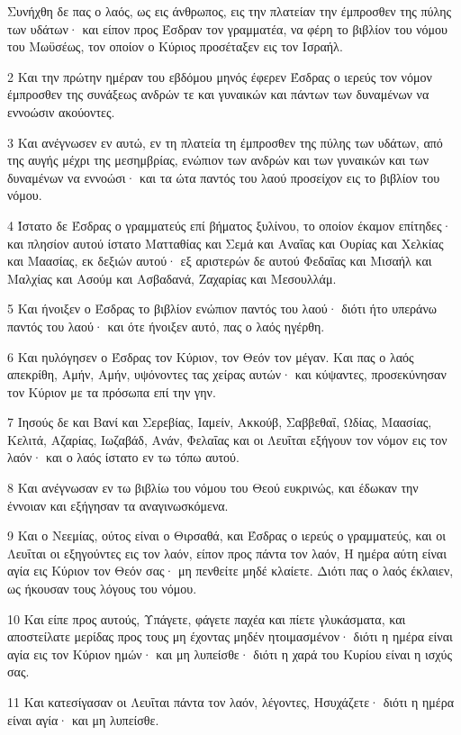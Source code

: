\par Συνήχθη δε πας ο λαός, ως εις άνθρωπος, εις την πλατείαν την έμπροσθεν της πύλης των υδάτων· και είπον προς Έσδραν τον γραμματέα, να φέρη το βιβλίον του νόμου του Μωϋσέως, τον οποίον ο Κύριος προσέταξεν εις τον Ισραήλ.
\par 2 Και την πρώτην ημέραν του εβδόμου μηνός έφερεν Έσδρας ο ιερεύς τον νόμον έμπροσθεν της συνάξεως ανδρών τε και γυναικών και πάντων των δυναμένων να εννοώσιν ακούοντες.
\par 3 Και ανέγνωσεν εν αυτώ, εν τη πλατεία τη έμπροσθεν της πύλης των υδάτων, από της αυγής μέχρι της μεσημβρίας, ενώπιον των ανδρών και των γυναικών και των δυναμένων να εννοώσι· και τα ώτα παντός του λαού προσείχον εις το βιβλίον του νόμου.
\par 4 Ίστατο δε Έσδρας ο γραμματεύς επί βήματος ξυλίνου, το οποίον έκαμον επίτηδες· και πλησίον αυτού ίστατο Ματταθίας και Σεμά και Αναΐας και Ουρίας και Χελκίας και Μαασίας, εκ δεξιών αυτού· εξ αριστερών δε αυτού Φεδαΐας και Μισαήλ και Μαλχίας και Ασούμ και Ασβαδανά, Ζαχαρίας και Μεσουλλάμ.
\par 5 Και ήνοιξεν ο Έσδρας το βιβλίον ενώπιον παντός του λαού· διότι ήτο υπεράνω παντός του λαού· και ότε ήνοιξεν αυτό, πας ο λαός ηγέρθη.
\par 6 Και ηυλόγησεν ο Έσδρας τον Κύριον, τον Θεόν τον μέγαν. Και πας ο λαός απεκρίθη, Αμήν, Αμήν, υψόνοντες τας χείρας αυτών· και κύψαντες, προσεκύνησαν τον Κύριον με τα πρόσωπα επί την γην.
\par 7 Ιησούς δε και Βανί και Σερεβίας, Ιαμείν, Ακκούβ, Σαββεθαΐ, Ωδίας, Μαασίας, Κελιτά, Αζαρίας, Ιωζαβάδ, Ανάν, Φελαΐας και οι Λευΐται εξήγουν τον νόμον εις τον λαόν· και ο λαός ίστατο εν τω τόπω αυτού.
\par 8 Και ανέγνωσαν εν τω βιβλίω του νόμου του Θεού ευκρινώς, και έδωκαν την έννοιαν και εξήγησαν τα αναγινωσκόμενα.
\par 9 Και ο Νεεμίας, ούτος είναι ο Θιρσαθά, και Έσδρας ο ιερεύς ο γραμματεύς, και οι Λευΐται οι εξηγούντες εις τον λαόν, είπον προς πάντα τον λαόν, Η ημέρα αύτη είναι αγία εις Κύριον τον Θεόν σας· μη πενθείτε μηδέ κλαίετε. Διότι πας ο λαός έκλαιεν, ως ήκουσαν τους λόγους του νόμου.
\par 10 Και είπε προς αυτούς, Υπάγετε, φάγετε παχέα και πίετε γλυκάσματα, και αποστείλατε μερίδας προς τους μη έχοντας μηδέν ητοιμασμένον· διότι η ημέρα είναι αγία εις τον Κύριον ημών· και μη λυπείσθε· διότι η χαρά του Κυρίου είναι η ισχύς σας.
\par 11 Και κατεσίγασαν οι Λευΐται πάντα τον λαόν, λέγοντες, Ησυχάζετε· διότι η ημέρα είναι αγία· και μη λυπείσθε.

